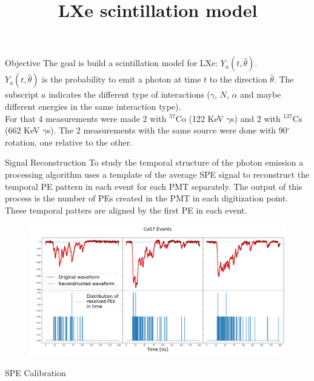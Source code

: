 \documentclass{beamer}
\title{LXe scintillation model}
\begin{document}
{ 
\frame{\titlepage}}

\begin{frame}{Objective}
The goal is build a scintillation model for LXe: $Y_{a}(t,\hat{\theta})$.\\
$Y_{a}(t,\hat{\theta})$ is the probability to emit a photon at time $t$ to the direction $\hat{\theta}$. The subscript $a$ indicates the different type of interactions ($\gamma$, $N$, $\alpha$ and maybe different energies in the same interaction type).\\

For that 4 measurements were made 2 with $^{57}$Co (122 KeV $\gamma$s) and 2 with $^{137}$Cs (662 KeV $\gamma$s). The 2 measurements with the same source were done with 90$^\circ$ rotation, one relative to the other.
\end{frame}


\begin{frame}{Signal Reconstruction}
To study the temporal structure of the photon emission a processing algorithm uses a template of the average SPE signal to reconstruct the temporal PE pattern in each event for each PMT separately. The output of this process is the number of PEs created in the PMT in each digitization point. These temporal patters are aligned by the first PE in each event.

\begin{figure}[h]
\includegraphics[width=1\textwidth]{recons.png}
\end{figure}
\end{frame}

\begin{frame}{SPE Calibration}

\end{frame}
\end{document}

